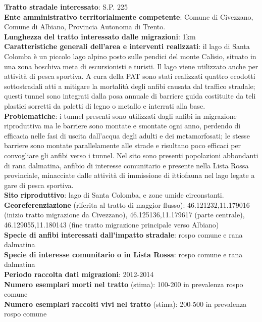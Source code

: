 \documentclass[11pt,a4paper,twoside]{memoir}
\begin{document}
\textbf{Tratto stradale interessato}: S.P. 225 \\
\textbf{Ente amministrativo territorialmente competente}: Comune di Civezzano, Comune di Albiano, Provincia Autonoma di Trento. \\
\textbf{Lunghezza del tratto interessato dalle migrazioni}: 1km \\
\textbf{Caratteristiche generali dell’area e interventi realizzati}: il lago di Santa Colomba è un piccolo lago alpino posto sulle pendici del monte Calisio, situato in una zona boschiva meta di escursionisti e turisti. Il lago viene utilizzato anche per attività di pesca sportiva. A cura della PAT sono stati realizzati quattro ecodotti sottostradali atti a mitigare la mortalità degli anfibi causata dal traffico stradale; questi tunnel sono integrati dalla posa annuale di barriere guida costituite da teli plastici sorretti da paletti di legno o metallo e interrati alla base. \\
\textbf{Problematiche}: i tunnel presenti sono utilizzati dagli anfibi in migrazione riproduttiva ma le barriere sono montate e smontate ogni anno, perdendo di efficacia nelle fasi di uscita dall'acqua degli adulti e dei metamorfosati; le stesse barriere sono montate parallelamente alle strade e risultano poco efficaci per convogliare gli anfibi verso i tunnel. Nel sito sono presenti popolazioni abbondanti di rana dalmatina, anfibio di interesse comunitario e presente nella Lista Rossa provinciale, minacciate dalle attività di immissione di ittiofauna nel lago legate a gare di pesca sportiva. \\
\textbf{Sito riproduttivo}: lago di Santa Colomba, e zone umide circonstanti. \\
\textbf{Georeferenziazione} (riferita al tratto di maggior flusso): 46.121232,11.179016 (inizio tratto migrazione da Civezzano), 46.125136,11.179617 (parte centrale), 46.129055,11.180143 (fine tratto migrazione principale verso Albiano) \\
\textbf{Specie di anfibi interessati dall’impatto stradale}: rospo comune e rana dalmatina \\
\textbf{Specie di interesse comunitario o in Lista Rossa}: rospo comune e rana dalmatina \\
\textbf{Periodo raccolta dati migrazioni}: 2012-2014 \\
\textbf{Numero esemplari morti nel tratto} (stima): 100-200 in prevalenza rospo comune \\
\textbf{Numero esemplari raccolti vivi nel tratto} (stima): 200-500 in prevalenza rospo comune \\
\end{document}
